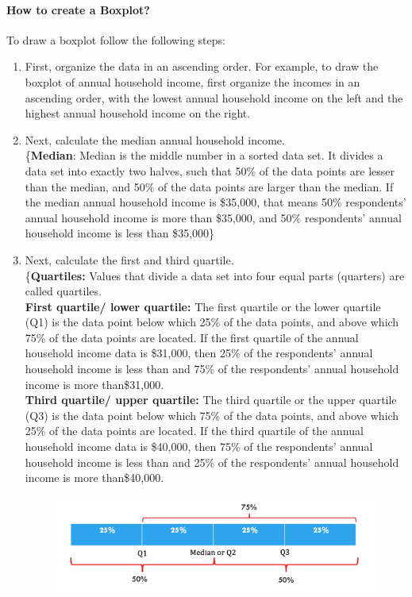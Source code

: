 \documentclass[a4paper, 11pt]{article}
\begin{document}
	\paragraph{How to create a Boxplot?}
			To draw a boxplot follow the following steps: 
			\begin{enumerate}[label=(\alph*), noitemsep]
			\item
			First, organize the data in an ascending order. For example, to draw the boxplot of annual household income, first organize the incomes in an ascending order, with the lowest annual household income on the left and the highest annual household income on the right.
			\item
			Next, calculate the median annual household income.\\[1ex]
			\{\textbf{Median}: Median is the middle number in a sorted data set. It divides a data set into exactly two halves, such that 50\% of the data points are lesser than the median, and 50\% of the data points are larger than the median. If the median annual household income is \$35,000, that means 50\% respondents' annual household income is more than \$35,000, and 50\% respondents' annual household income is less than \$35,000\}
			\item
			Next, calculate the first and third quartile.\\[1ex]
			\{\textbf{Quartiles:} Values that divide a data set into four equal parts (quarters) are called quartiles.\\[1ex]
			\textbf{First quartile/ lower quartile:} The first quartile or the lower quartile (Q1) is the data point below which 25\% of the data points, and above which 75\% of the data points are located. If the first quartile of the annual household income data is \$31,000, then 25\% of the respondents' annual household income is less than and 75\% of the respondents' annual household income is more than\$31,000. \\[1ex]
			\textbf{Third quartile/ upper quartile:} The third quartile or the upper quartile (Q3) is the data point below which 75\% of the data points, and above which 25\% of the data points are located. If the third quartile of the annual household income data is \$40,000, then 75\% of the respondents' annual household income is less than and 25\% of the respondents' annual household income is more than\$40,000.\\[1ex]
				\begin{figure}[h!]
		\includegraphics[width=\linewidth]{Quartile.jpg}

\end{figure}
\end{enumerate}
\end{document}
